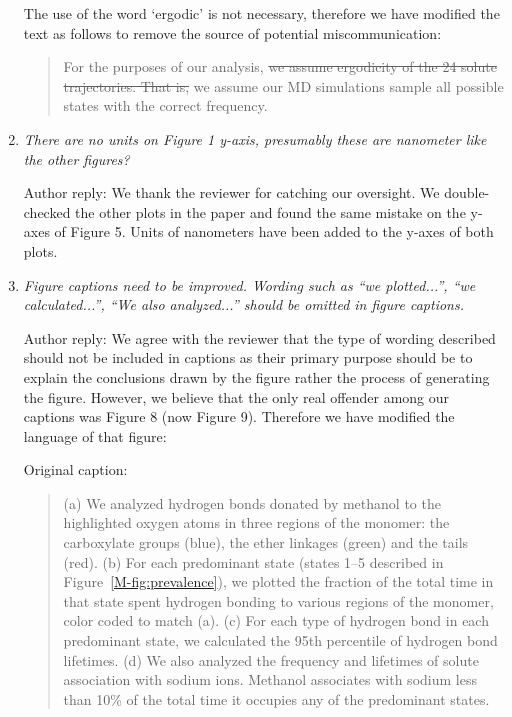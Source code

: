 \documentclass{article}
\begin{document}
\begin{enumerate}[label={Comment \theenumi :}, leftmargin=3.9\parindent]
    The use of the word `ergodic' is not necessary, therefore we have modified the text as follows
    to remove the source of potential miscommunication:
    
    \begin{quote}
    For the purposes of our analysis, \sout{we assume ergodicity of the 24 solute trajectories. That is,}
    we assume our MD simulations sample all possible states with the correct frequency.
    \end{quote}    
    
    \item \textit{There are no units on Figure 1 y-axis, presumably these are nanometer like the 
    other figures?}
    
    Author reply: We thank the reviewer for catching our oversight. We double-checked the 
    other plots in the paper and found the same mistake on the y-axes of Figure 5. Units of nanometers
    have been added to the y-axes of both plots.
    
    \item \textit{Figure captions need to be improved. Wording such as “we plotted...”, “we 
    calculated...”, “We also analyzed...” should be omitted in figure captions.}  
    
    Author reply: We agree with the reviewer that the type of wording described should not be
    included in captions as their primary purpose should be to explain the conclusions drawn
    by the figure rather the process of generating the figure. However, we believe that the 
    only real offender among our captions was Figure 8 (now Figure 9). Therefore we have modified the language
    of that figure:
    
    Original caption:
    \begin{quote}
    (a) We analyzed hydrogen bonds donated by methanol to the highlighted oxygen
    atoms in three regions of the monomer: the carboxylate groups (blue), the ether linkages
    (green) and the tails (red). (b) For each predominant state (states 1--5 described in 
    Figure~\ref{M-fig:prevalence}), we plotted the fraction of the total time in that state 
    spent hydrogen bonding to various regions of the monomer, color coded to match (a).
    (c) For each type of hydrogen bond in each predominant state, we calculated the 95th percentile
    of hydrogen bond lifetimes. (d) We also analyzed the frequency and lifetimes of solute 
    association with sodium ions. Methanol associates with sodium less than 10\% of the total 
    time it occupies any of the predominant states.
    \end{quote}    
    

\end{enumerate}
\end{document}
